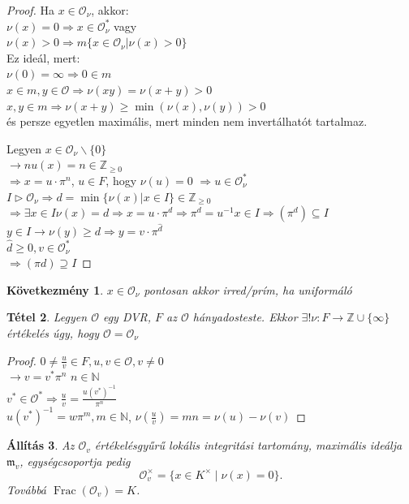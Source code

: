 \documentclass[11pt,a4paper]{article}
\newtheorem{tetel}{Tétel}[section]
\newtheorem{allitas}[tetel]{Állítás}
\newtheorem{kovetkezmeny}[tetel]{Következmény}
\theoremstyle{definition}
\DeclareMathOperator{\Frac}{Frac}
\newcommand{\OO}{\mathcal O}
\newcommand{\mm}{\mathfrak m}
\begin{document}
\begin{proof}
    Ha $x\in \OO_\nu$, akkor: \\
    $\nu(x)=0 \Rightarrow x\in \OO_\nu^*$ vagy \\
    $\nu(x)>0 \Rightarrow m\{x\in\OO_\nu|\nu(x)>0\}$ \\
    Ez ideál, mert: \\
    $\nu(0)=\infty \Rightarrow 0\in m$ \\
    $x\in m, y \in \OO \Rightarrow \nu (xy)= \nu(x+y)>0$ \\
    $x,y\in m \Rightarrow \nu(x+y)\geq \min(\nu(x),\nu(y))>0$ \\
    és persze egyetlen maximális, mert minden nem invertálhatót tartalmaz.
     
     
     Legyen $x\in \OO_\nu\backslash\{0\}$ \\
    $\rightarrow nu(x) = n\in \mathbb{Z}_{\geq0}$\\
    $\Rightarrow x = u\cdot \pi^n$, $u\in F$, hogy $\nu(u)=0$ $\Rightarrow u\in \OO_\nu^*$\\
    $I\rhd \OO_\nu \Rightarrow d = \min\{ \nu(x)|x\in I\}\in\mathbb{Z}_{\geq0}$ \\
    $\Rightarrow \exists x\in I \nu(x)=d\Rightarrow x=u\cdot\pi^d\Rightarrow \pi^d=u^{-1}x\in I\Rightarrow(\pi^d)\subseteq I$ \\ 
    $y\in I \rightarrow \nu(y) \geq d \Rightarrow y = v\cdot\pi^{\hat{d}}$ \\
    $\hat{d}\geq 0, v \in \OO_\nu^*$\\
    $\Rightarrow (\pi d)\supseteq I$
\end{proof}
\begin{kovetkezmeny}
    $x\in \OO_\nu$ pontosan akkor irred/prím, ha uniformáló
\end{kovetkezmeny}

\begin{tetel}
    Legyen $\OO$ egy DVR, $F$ az $\OO$ hányadosteste. Ekkor $\exists!\nu:F\rightarrow\mathbb{Z}\cup\{\infty\}$ értékelés úgy, hogy $\OO = \OO_\nu$
\end{tetel}
\begin{proof}
    $0 \neq \frac{u}{v}\in F,u,v\in\OO, v\neq0$ \\
    $\rightarrow v=v^*\pi^n$ $n\in\mathbb{N}$ \\
    $v^*\in\OO^*\Rightarrow\frac{u}{v}=\frac{u(v^*)^{-1}}{\pi^n}$\\
    $u(v^*)^{-1}=w\pi^m, m\in\mathbb{N}$, $ \nu(\frac{u}{v})=mn= \nu(u)-\nu(v)$
\end{proof}
\begin{allitas}
Az $\OO_v$ értékelésgyűrű lokális integritási tartomány, maximális ideálja
$\mm_v$, egységcsoportja pedig
\[
  \OO_v^\times=\{x\in K^\times\mid 
\nu(x)=0\}.
\]
Továbbá $\Frac(\OO_v)=K$.
\end{allitas}
\end{document}
